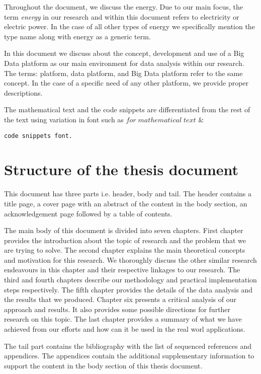 Throughout the document, we discuss the energy. Due to our main focus, the term \emph{energy} in our research and within this document refers to electricity or electric power. In the case of all other types of energy we specifically mention the type name along with energy as a generic term.

In this document we discuss about the concept, development and use of a Big Data platform as our main environment for data analysis within our research. The terms: platform, data platform, and Big Data platform refer to the same concept. In the case of a specific need of any other platform, we provide proper descriptions.

The mathematical text and the code snippets are differentiated from the rest of the text using variation in font such as \(for\; mathematical\;text\) \& \begin{lstlisting}
code snippets font. \end{lstlisting}


\section{Structure of the thesis document}
\label{section:structure} 
This document has three parts i.e. header, body and tail. The header contains a title page, a cover page with an abstract of the content in the body section, an acknowledgement page followed by a table of contents.

The main body of this document is divided into seven chapters. First chapter provides the introduction about the topic of research and the problem that we are trying to solve. The second chapter explains the main theoretical concepts and motivation for this research. We thoroughly discuss the other similar research endeavours in this chapter and their respective linkages to our research. The third and fourth chapters describe our methodology and practical implementation steps respectively. The fifth chapter provides the details of the data analysis and the results that we produced. Chapter six presents a critical analysis of our approach and  results. It also provides some possible directions for further research on this topic. The last chapter provides a summary of what we have achieved from our efforts and how can it be used in the real worl applications.

The tail part contains the bibliography with the list of sequenced references and appendices. The appendices contain the additional supplementary information to support the content in the body section of this thesis document.  


